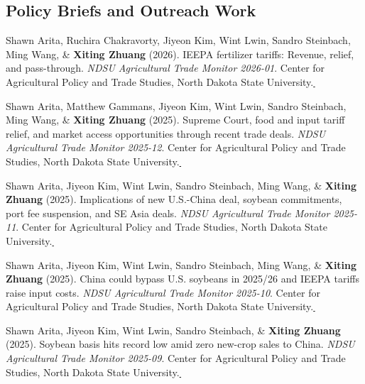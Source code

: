\documentclass[10.5pt,letterpaper]{article}
\newcommand{\paperlink}[1]{\href{#1}{\,\small\faExternalLink}}
\renewenvironment{itemize}{
	\begin{list}{}{
			\setlength{\leftmargin}{1.5em}
		}
	}{
	\end{list}
}
\begin{document}
	\subsection*{\textbf{Policy Briefs and Outreach Work}}
	\begin{itemize}
		
		\item[-] Shawn Arita, Ruchira Chakravorty, Jiyeon Kim, Wint Lwin, Sandro Steinbach, Ming Wang, \& \textbf{Xiting Zhuang} (2026). IEEPA fertilizer tariffs: Revenue, relief, and pass-through. \textit{NDSU Agricultural Trade Monitor 2026-01}. Center for Agricultural Policy and Trade Studies, North Dakota State University.\paperlink{https://www.capts-ndsu.com/_files/ugd/3c6228_df79f1f42b5f4d98a0428a2c43085b98.pdf}
		
		\item[-] Shawn Arita, Matthew Gammans, Jiyeon Kim, Wint Lwin, Sandro Steinbach, Ming Wang, \& \textbf{Xiting Zhuang} (2025). Supreme Court, food and input tariff relief, and market access opportunities through recent trade deals. \textit{NDSU Agricultural Trade Monitor 2025-12}. Center for Agricultural Policy and Trade Studies, North Dakota State University.\paperlink{https://www.capts-ndsu.com/_files/ugd/3c6228_c0952c30cd4848a7b76fead0aed0853e.pdf}
		
		\item[-] Shawn Arita, Jiyeon Kim, Wint Lwin, Sandro Steinbach, Ming Wang, \& \textbf{Xiting Zhuang} (2025). Implications of new U.S.-China deal, soybean commitments, port fee suspension, and SE Asia deals. \textit{NDSU Agricultural Trade Monitor 2025-11}. Center for Agricultural Policy and Trade Studies, North Dakota State University.\paperlink{https://www.capts-ndsu.com/_files/ugd/3c6228_26d85e314b884039ac6aa9f2d9b3b739.pdf}
		
		\item[-] Shawn Arita, Jiyeon Kim, Wint Lwin, Sandro Steinbach, Ming Wang, \& \textbf{Xiting Zhuang} (2025). China could bypass U.S. soybeans in 2025/26 and IEEPA tariffs raise input costs. \textit{NDSU Agricultural Trade Monitor 2025-10}. Center for Agricultural Policy and Trade Studies, North Dakota State University.\paperlink{https://www.capts-ndsu.com/_files/ugd/3c6228_8ba2525b1280446489c686bb8f45bef1.pdf}
		
		\item[-] Shawn Arita, Jiyeon Kim, Wint Lwin, Sandro Steinbach, \& \textbf{Xiting Zhuang} (2025). Soybean basis hits record low amid zero new-crop sales to China. \textit{NDSU Agricultural Trade Monitor 2025-09}. Center for Agricultural Policy and Trade Studies, North Dakota State University.\paperlink{https://www.capts-ndsu.com/_files/ugd/3c6228_a43f5e48de2d400f88da267c58abfc6f.pdf}
		

\end{itemize}
\end{document}
